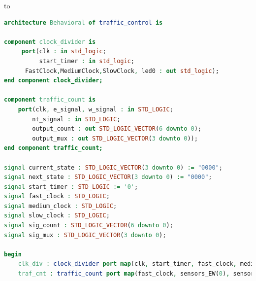 to\documentclass[11pt]{article}
\begin{document}
\begin{appendices}
\begin{lstlisting}[language=VHDL]
architecture Behavioral of traffic_control is

component clock_divider is
     port(clk : in std_logic;
          start_timer : in std_logic;
	  FastClock,MediumClock,SlowClock, led0 : out std_logic);
end component clock_divider;

component traffic_count is
    port(clk, e_signal, w_signal : in STD_LOGIC;
        nt_signal : in STD_LOGIC;
        output_count : out STD_LOGIC_VECTOR(6 downto 0);
        output_mux : out STD_LOGIC_VECTOR(3 downto 0));
end component traffic_count;

signal current_state : STD_LOGIC_VECTOR(3 downto 0) := "0000";
signal next_state : STD_LOGIC_VECTOR(3 downto 0) := "0000";
signal start_timer : STD_LOGIC := '0';
signal fast_clock : STD_LOGIC;
signal medium_clock : STD_LOGIC;
signal slow_clock : STD_LOGIC;
signal sig_count : STD_LOGIC_VECTOR(6 downto 0);
signal sig_mux : STD_LOGIC_VECTOR(3 downto 0);

begin
    clk_div : clock_divider port map(clk, start_timer, fast_clock, medium_clock, slow_clock, clock_led);
    traf_cnt : traffic_count port map(fast_clock, sensors_EW(0), sensors_EW(1), sensor_NT, sig_count, sig_mux);
    

\end{lstlisting}
\end{appendices}
\end{document}
